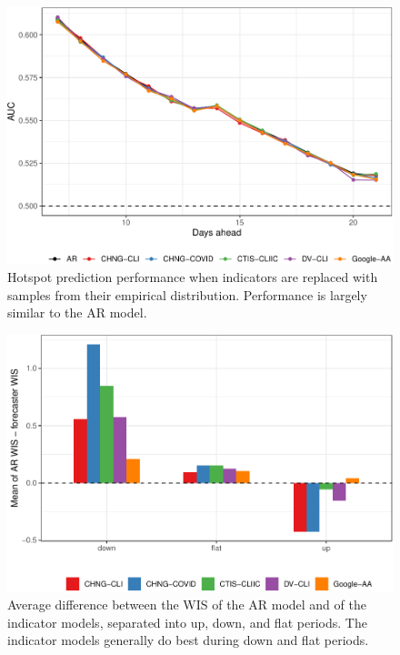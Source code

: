 \documentclass[9pt,twoside,lineno]{pnas-new}
\begin{document}
\clearpage

\begin{figure}

{\centering \includegraphics[width=\textwidth]{fig/hot-booted-1} 

}

\caption{Hotspot prediction performance when indicators are replaced with samples from their empirical distribution. Performance is largely similar to the AR model.}\label{fig:hot-booted}
\end{figure}

\clearpage

\begin{figure}

{\centering \includegraphics[width=\textwidth]{fig/upswing-summary-1} 

}

\caption{Average difference between the WIS of the AR model and of the indicator models, separated into up, down, and flat periods. The indicator models generally do best during down and flat periods.}\label{fig:upswing-summary}
\end{figure}
\end{document}
